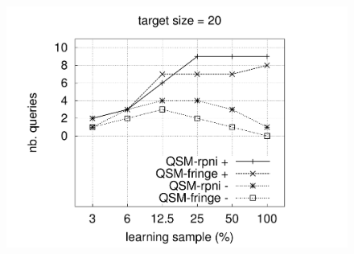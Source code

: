 \begin{figure}[H]
{  \includegraphics[trim=25mm 21mm 35mm 20mm, clip, page=11]{src/5-evaluation/images/queries}
}
\end{figure}

